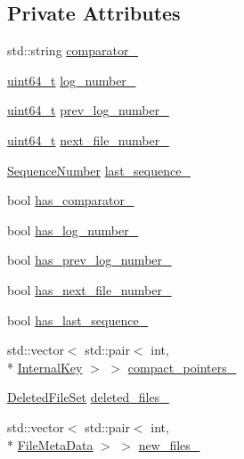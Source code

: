 \subsection*{Private Attributes}
\begin{DoxyCompactItemize}
\item 
std\-::string \hyperlink{classleveldb_1_1_version_edit_abc12f1138eab74643342b6a5de10521c}{comparator\-\_\-}
\item 
\hyperlink{stdint_8h_aaa5d1cd013383c889537491c3cfd9aad}{uint64\-\_\-t} \hyperlink{classleveldb_1_1_version_edit_a526b91059db8175f1f4f56d00a5bf4d4}{log\-\_\-number\-\_\-}
\item 
\hyperlink{stdint_8h_aaa5d1cd013383c889537491c3cfd9aad}{uint64\-\_\-t} \hyperlink{classleveldb_1_1_version_edit_ac8762934b27315cb0ba897c306412562}{prev\-\_\-log\-\_\-number\-\_\-}
\item 
\hyperlink{stdint_8h_aaa5d1cd013383c889537491c3cfd9aad}{uint64\-\_\-t} \hyperlink{classleveldb_1_1_version_edit_a8da3ef0a05e96034b2cc5d32fd06bccb}{next\-\_\-file\-\_\-number\-\_\-}
\item 
\hyperlink{namespaceleveldb_a5481ededd221c36d652c371249f869fa}{Sequence\-Number} \hyperlink{classleveldb_1_1_version_edit_af7718924a84a2a655a27104070580d09}{last\-\_\-sequence\-\_\-}
\item 
bool \hyperlink{classleveldb_1_1_version_edit_a2363546c6ba6b79162058c9d8d9980af}{has\-\_\-comparator\-\_\-}
\item 
bool \hyperlink{classleveldb_1_1_version_edit_a72cf0203239ea5cfcb231c99ad430df1}{has\-\_\-log\-\_\-number\-\_\-}
\item 
bool \hyperlink{classleveldb_1_1_version_edit_aede87f4a703e74d16890ef4fa96df7fc}{has\-\_\-prev\-\_\-log\-\_\-number\-\_\-}
\item 
bool \hyperlink{classleveldb_1_1_version_edit_a71f032cd98934d100d84363c08f033d8}{has\-\_\-next\-\_\-file\-\_\-number\-\_\-}
\item 
bool \hyperlink{classleveldb_1_1_version_edit_aa7e36bdcdd10c4e17b9bc86281cd7cb8}{has\-\_\-last\-\_\-sequence\-\_\-}
\item 
std\-::vector$<$ std\-::pair$<$ int, \\*
\hyperlink{classleveldb_1_1_internal_key}{Internal\-Key} $>$ $>$ \hyperlink{classleveldb_1_1_version_edit_a26d90b4b4924dc53222177be1770062e}{compact\-\_\-pointers\-\_\-}
\item 
\hyperlink{classleveldb_1_1_version_edit_af4a08c41c6232dbca0dd31c2e3fa7a9b}{Deleted\-File\-Set} \hyperlink{classleveldb_1_1_version_edit_a8d824f3b31d232c58aface3621730c94}{deleted\-\_\-files\-\_\-}
\item 
std\-::vector$<$ std\-::pair$<$ int, \\*
\hyperlink{structleveldb_1_1_file_meta_data}{File\-Meta\-Data} $>$ $>$ \hyperlink{classleveldb_1_1_version_edit_ae53f738806bc6e1e17a8c128129832a6}{new\-\_\-files\-\_\-}
\end{DoxyCompactItemize}
